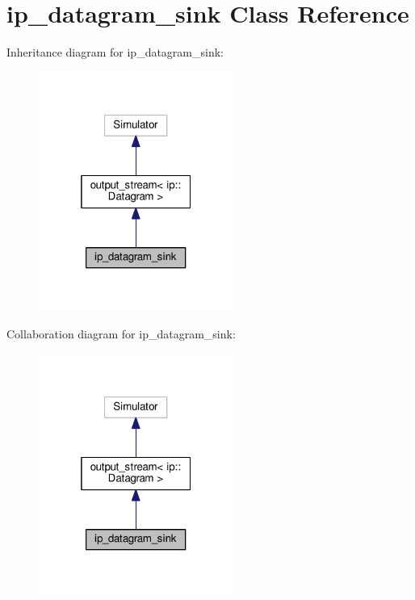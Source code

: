 \hypertarget{classip__datagram__sink}{}\section{ip\+\_\+datagram\+\_\+sink Class Reference}
\label{classip__datagram__sink}


Inheritance diagram for ip\+\_\+datagram\+\_\+sink\+:
\nopagebreak
\begin{figure}[H]
\begin{center}
\leavevmode
\includegraphics[width=181pt]{classip__datagram__sink__inherit__graph}
\end{center}
\end{figure}


Collaboration diagram for ip\+\_\+datagram\+\_\+sink\+:
\nopagebreak
\begin{figure}[H]
\begin{center}
\leavevmode
\includegraphics[width=181pt]{classip__datagram__sink__coll__graph}
\end{center}
\end{figure}
